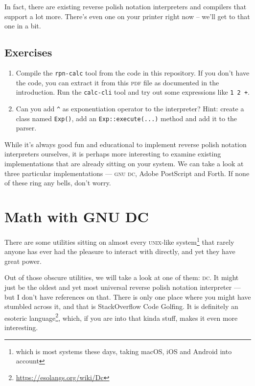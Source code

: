 \documentclass[a4paper,twocolumn]{article}
\begin{document}
In fact, there are existing reverse polish notation interpreters and compilers that support a lot more. There's even one on your printer right now -- we'll get to that one in a bit.

\subsection*{Exercises}

\begin{enumerate}
  \item Compile the \verb|rpn-calc| tool from the code in this repository. If you don't have the code, you can extract it from this \textsc{pdf} file as documented in the introduction. Run the \verb|calc-cli| tool and try out some expressions like \verb|1 2 +|.

  \item Can you add \verb|^| as exponentiation operator to the interpreter? Hint: create a class named \verb|Exp()|, add an \verb|Exp::execute(...)| method and add it to the parser.
\end{enumerate}

While it's always good fun and educational to implement reverse polish notation interpreters ourselves, it is perhaps more interesting to examine existing implementations that are already sitting on your system. We can take a look at three particular implementations — \textsc{gnu dc}, Adobe PostScript and Forth. If none of these ring any bells, don't worry. 

\section{Math with GNU DC}

There are some utilities sitting on almost every \textsc{unix}-like system\footnote{which is most systems these days, taking macOS, iOS and Android into account} that rarely anyone has ever had the pleasure to interact with directly, and yet they have great power.

Out of those obscure utilities, we will take a look at one of them: \textsc{dc}. It might just be the oldest and yet most universal reverse polish notation interpreter — but I don't have references on that. There is only one place where you might have stumbled across it, and that is StackOverflow Code Golfing. It is definitely an esoteric language\footnote{\url{https://esolangs.org/wiki/Dc}}, which, if you are into that kinda stuff, makes it even more interesting.
\end{document}

